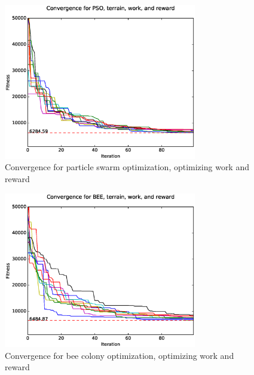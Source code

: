 \documentclass{tamuccthesis}
\begin{document}
\begin{figure}[H]
    \captionsetup{justification=centering}
    \centering
        \includegraphics[width=0.75\textwidth,trim={0cm 0.75cm 0cm 0.75cm},clip]{conv_PSO_b.eps}
    \caption{Convergence for particle swarm optimization, optimizing work and reward}
    \label{fig:convergence_b_PSO}
\end{figure}

\begin{figure}[H]
    \captionsetup{justification=centering}
    \centering
        \includegraphics[width=0.75\textwidth,trim={0cm 0.75cm 0cm 0.75cm},clip]{conv_BEE_b.eps}
    \caption{Convergence for bee colony optimization, optimizing work and reward}
    \label{fig:convergence_b_BEE}
\end{figure}
\end{document}
